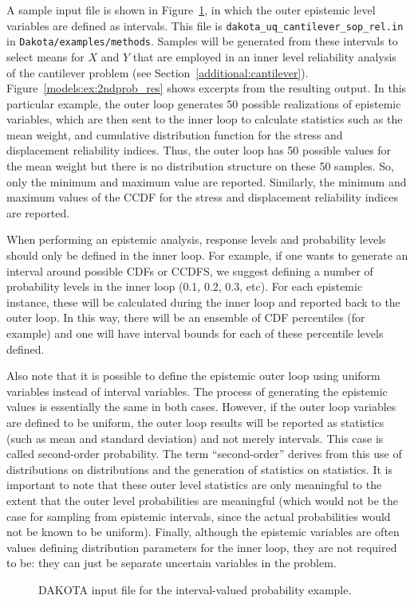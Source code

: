 A sample input file is shown in Figure~\ref{models:ex:2ndprob}, in
which the outer epistemic level variables are defined as intervals. 
This file is \texttt{dakota\_uq\_cantilever\_sop\_rel.in} 
in \texttt{Dakota/examples/methods}.  Samples will be generated from these intervals to select means for
$X$ and $Y$ that are employed in an inner level reliability analysis
of the cantilever problem (see Section~\ref{additional:cantilever}).
Figure~\ref{models:ex:2ndprob_res} shows excerpts from the resulting
output.  In this particular example, the outer loop generates 50 
possible realizations of epistemic variables, which are then 
sent to the inner loop to calculate statistics such as 
the mean weight, 
and cumulative distribution function for the stress and displacement
reliability indices.  Thus, the outer loop has 50 possible values for the mean 
weight but there is no distribution structure on these 50 samples.  So, 
only the minimum and maximum value are reported.  Similarly, the 
minimum and maximum values of the CCDF for the stress and 
displacement reliability indices are reported. 

When performing an epistemic analysis, response levels and 
probability levels should only be defined in the inner loop. 
For example, if one wants to generate an interval around possible 
CDFs or CCDFS, we suggest defining a number of probability levels 
in the inner loop (0.1, 0.2, 0.3, etc).  For each epistemic instance, 
these will be calculated during the inner loop and reported back to the 
outer loop.  In this way, there will be an ensemble of CDF percentiles 
(for example) and one will have interval bounds for each of these 
percentile levels defined.  

Also note that it is possible to define the epistemic outer 
loop using uniform variables instead of interval variables.  The 
process of generating the epistemic values is essentially the 
same in both cases.  However, if the outer loop variables are 
defined to be uniform, the outer loop results will be reported as 
statistics (such as mean and standard deviation) and not merely intervals. 
This case is called second-order probability. 
The term ``second-order'' derives from this use of distributions on
distributions and the generation of statistics on statistics. 
It is important to note that these outer level
statistics are only meaningful to the extent that the outer level
probabilities are meaningful (which would not be the case for sampling
from epistemic intervals, since the actual probabilities would not be
known to be uniform).  Finally, although the epistemic variables are 
often values defining distribution parameters for the inner loop, 
they are not required to be: they can just be separate uncertain variables 
in the problem. 
\begin{figure}
  \centering
  \begin{bigbox}
    \begin{tiny}
    \end{tiny}
  \end{bigbox}
  \caption{DAKOTA input file for the interval-valued probability example.}
  \label{models:ex:2ndprob}
\end{figure}

